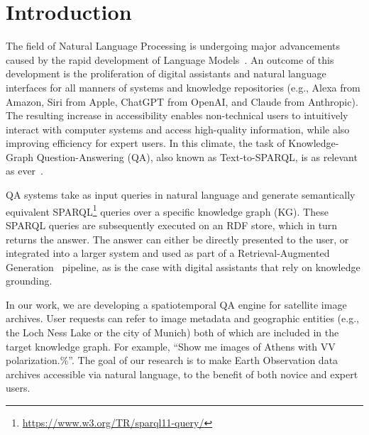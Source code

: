 \section{Introduction}

The field of Natural Language Processing is undergoing major advancements caused by the rapid development of Language Models~\cite{openai2024gpt4technicalreport, llama2, mistral}. An outcome of this development is the proliferation of digital assistants and natural language interfaces for all manners of systems and knowledge repositories (e.g., Alexa from Amazon, Siri from Apple, ChatGPT from OpenAI, and Claude from Anthropic). The resulting increase in accessibility enables non-technical users to intuitively interact with computer systems and access high-quality information, while also improving efficiency for expert users.  In this climate, the task of Knowledge-Graph Question-Answering (QA), also known as Text-to-SPARQL, is as relevant as ever~\cite{qa-survey1, qa-survey2}. 

QA systems take as input queries in natural language and generate semantically equivalent SPARQL\footnote{\url{https://www.w3.org/TR/sparql11-query/}} queries over a specific knowledge graph (KG). These SPARQL queries are subsequently executed on an RDF store, which in turn returns the answer. The answer can either be directly presented to the user, or integrated into a larger system and used as part of a Retrieval-Augmented Generation~\cite{rag} pipeline, as is the case with digital assistants that rely on knowledge grounding.

In our work, we are developing \EngineName{} a spatiotemporal QA engine for satellite image archives. 
User requests can refer to image metadata and geographic entities (e.g., the Loch Ness Lake or the city of Munich) both of which are included in the target knowledge graph. For example, ``Show me images of Athens with VV polarization.\%''. The goal of our research is to make Earth Observation data archives accessible via natural language, to the benefit of both novice and expert users.

